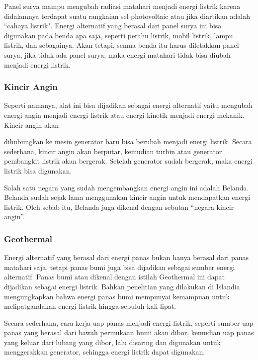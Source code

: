 \documentclass[../wastek.tex]{subfiles}
\begin{document}
Panel surya mampu mengubah radiasi matahari menjadi energi listrik karena didalamnya terdapat suatu rangkaian sel photovoltaic atau jika diartikan adalah ``cahaya listrik". Energi alternatif yang berasal dari panel surya ini bisa digunakan pada benda apa saja, seperti perahu listrik, mobil listrik, lampu listrik, dan sebagainya. Akan tetapi, semua benda itu harus diletakkan panel surya, jika tidak ada panel surya, maka energi matahari tidak bisa diubah menjadi energi listrik.

\subsubsection{Kincir Angin}%
\label{ssub:kincir_angin}

Seperti namanya, alat ini bisa dijadikan sebagai energi alternatif yaitu mengubah energi angin menjadi energi listrik atau energi kinetik menjadi energi mekanik. Kincir angin akan

dihubungkan ke mesin generator baru bisa berubah menjadi energi listrik. Secara sederhana, kincir angin akan berputar, kemudian turbin atau generator pembangkit listrik akan bergerak. Setelah generator sudah bergerak, maka energi listrik bisa digunakan.

Salah satu negara yang sudah mengembangkan energi angin ini adalah Belanda. Belanda sudah sejak lama menggunakan kincir angin untuk mendapatkan energi listrik. Oleh sebab itu, Belanda juga dikenal dengan sebutan “negara kincir angin”.

\subsubsection{Geothermal}%
\label{ssub:geothermal}
Energi alternatif yang berasal dari energi panas bukan hanya berasal dari panas matahari saja, tetapi panas bumi juga bisa dijadikan sebagai sumber energi alternatif. Panas bumi atau dikenal dengan istilah Geothermal ini dapat dijadikan sebagai energi listrik. Bahkan penelitian yang dilakukan di Islandia mengungkapkan bahwa energi panas bumi mempunyai kemampuan untuk melipatgandakan energi listrik hingga sepuluh kali lipat.

Secara sederhana, cara kerja uap panas menjadi energi listrik, seperti sumber uap panas yang berasal dari bawah permukaan bumi akan dibor, kemudian uap panas yang keluar dari lubang yang dibor, lalu disaring dan digunakan untuk menggerakkan generator, sehingga energi listrik dapat digunakan.










\end{document}
